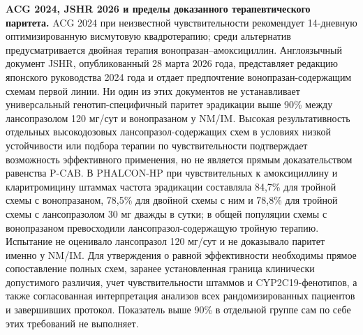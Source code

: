 \documentclass[11pt,a4paper,notitlepage]{report}
\newcommand{\src}[1]{\unskip\space\cite{#1}}
\begin{document}
\textbf{ACG 2024, JSHR 2026 и пределы доказанного терапевтического паритета.} ACG 2024 при неизвестной чувствительности рекомендует 14-дневную оптимизированную висмутовую квадротерапию; среди альтернатив предусматривается двойная терапия вонопразан--амоксициллин. Англоязычный документ JSHR, опубликованный 28 марта 2026 года, представляет редакцию японского руководства 2024 года и отдает предпочтение вонопразан-содержащим схемам первой линии. Ни один из этих документов не устанавливает универсальный генотип-специфичный паритет эрадикации выше 90\% между лансопразолом 120 мг/сут и вонопразаном у NM/IM.\src{acghp,jhp} Высокая результативность отдельных высокодозовых лансопразол-содержащих схем в условиях низкой устойчивости или подбора терапии по чувствительности подтверждает возможность эффективного применения, но не является прямым доказательством равенства P-CAB.\src{hphighdose2013} В PHALCON-HP при чувствительных к амоксициллину и кларитромицину штаммах частота эрадикации составляла 84,7\% для тройной схемы с вонопразаном, 78,5\% для двойной схемы с ним и 78,8\% для тройной схемы с лансопразолом 30 мг дважды в сутки; в общей популяции схемы с вонопразаном превосходили лансопразол-содержащую тройную терапию. Испытание не оценивало лансопразол 120 мг/сут и не доказывало паритет именно у NM/IM.\src{hpphalcon2022} Для утверждения о равной эффективности необходимы прямое сопоставление полных схем, заранее установленная граница клинически допустимого различия, учет чувствительности штаммов и CYP2C19-фенотипов, а также согласованная интерпретация анализов всех рандомизированных пациентов и завершивших протокол. Показатель выше 90\% в отдельной группе сам по себе этих требований не выполняет.\src{hpphalcon2022,acghp}
\end{document}
